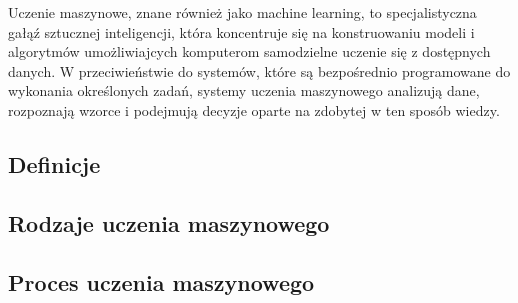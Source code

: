 Uczenie maszynowe, znane również jako machine learning, to specjalistyczna gałąź sztucznej inteligencji,
która koncentruje się na konstruowaniu modeli i algorytmów umożliwiajcych komputerom samodzielne uczenie się z dostępnych danych.
W przeciwieństwie do systemów, które są bezpośrednio programowane do wykonania określonych zadań,
systemy uczenia maszynowego analizują dane, rozpoznają wzorce i podejmują decyzje oparte na zdobytej w ten sposób wiedzy.

\subsection{Definicje}


\subsection{Rodzaje uczenia maszynowego}


\subsection{Proces uczenia maszynowego}
